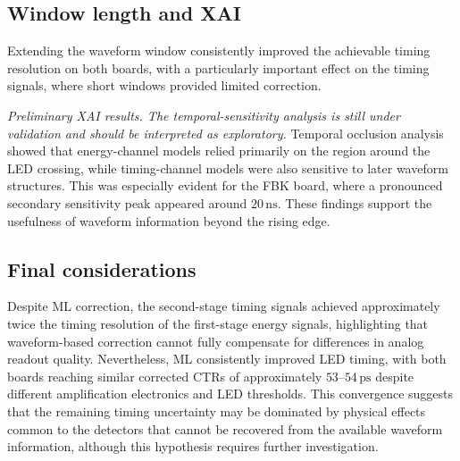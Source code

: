 \subsection{Window length and XAI}
Extending the waveform window consistently improved
 the achievable timing resolution on both boards, 
 with a particularly important effect on the timing signals, 
 where short windows provided limited correction. 

 \textit{Preliminary XAI results. The temporal-sensitivity analysis is
still under validation and should be interpreted as exploratory.}
 Temporal occlusion analysis showed that energy-channel 
 models relied primarily on the region around the LED crossing,  
 while timing-channel models were also sensitive to later waveform structures. 
 This was especially evident for the FBK board, where a 
 pronounced secondary sensitivity peak appeared around $20\,\mathrm{ns}$. 
 These findings support the usefulness of waveform information 
 beyond the rising edge.

 \subsection{Final considerations}
 Despite ML correction, the second-stage timing signals achieved 
 approximately twice the timing resolution of the first-stage energy signals, 
 highlighting that waveform-based correction cannot fully compensate for differences 
 in analog readout quality. 
 Nevertheless, ML consistently improved LED timing, with both boards reaching similar 
 corrected CTRs of approximately $53$–$54\,\mathrm{ps}$ despite different amplification 
 electronics and LED thresholds. 
 This convergence suggests that the remaining timing uncertainty may be dominated by 
 physical effects common to the detectors that cannot be recovered from the available 
 waveform information, although this hypothesis requires further investigation.
